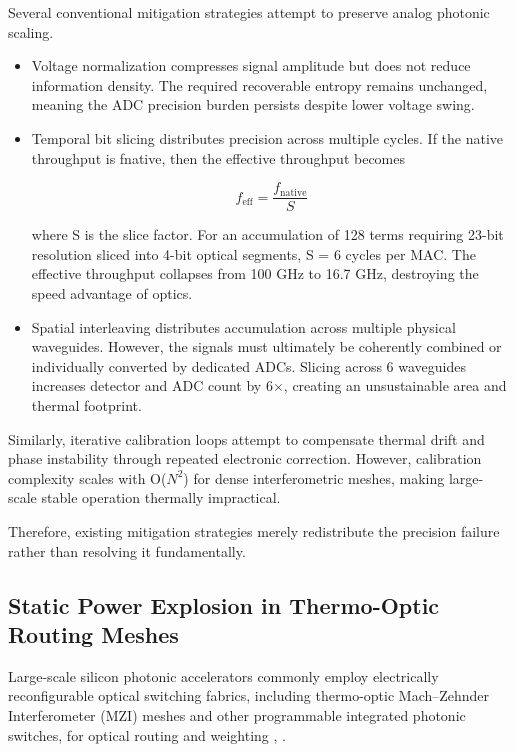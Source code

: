 \documentclass[journal]{IEEEtran}
\begin{document}
Several conventional mitigation strategies attempt to preserve analog photonic scaling.
\begin{itemize}
\item Voltage normalization compresses signal amplitude but does not reduce information density. The required recoverable entropy remains unchanged, meaning the ADC precision burden persists despite lower voltage swing.
\item Temporal bit slicing distributes precision across multiple cycles. If the native throughput is fnative, then the effective throughput becomes

\begin{equation}
f_{\text{eff}} = \frac{f_{\text{native}}}{S}
\end{equation}

where S is the slice factor. For an accumulation of 128 terms requiring 23-bit resolution sliced into 4-bit optical segments, S = 6 cycles per MAC. The effective throughput collapses from 100 GHz to 16.7 GHz, destroying the speed advantage of optics.
\item Spatial interleaving distributes accumulation across multiple physical waveguides. However, the signals must ultimately be coherently combined or individually converted by dedicated ADCs. Slicing across 6 waveguides increases detector and ADC count by 6$\times$, creating an unsustainable area and thermal footprint.
\end{itemize}

Similarly, iterative calibration loops attempt to compensate thermal drift and phase instability through repeated electronic correction.
However, calibration complexity scales with O($N^{2}$) for dense interferometric meshes, making large-scale stable operation thermally impractical. 

Therefore, existing mitigation strategies merely redistribute the precision failure rather than resolving it fundamentally.

\subsection{\textbf{Static Power Explosion in Thermo-Optic Routing Meshes}}
\label{sec:thermo_optic_scaling}

Large-scale silicon photonic accelerators commonly employ electrically reconfigurable optical switching fabrics, including thermo-optic Mach--Zehnder Interferometer (MZI) meshes and other programmable integrated photonic switches, for optical routing and weighting \cite{Miller2013}, \cite{Harris2018} \cite{Zhong2024}.
\end{document}
